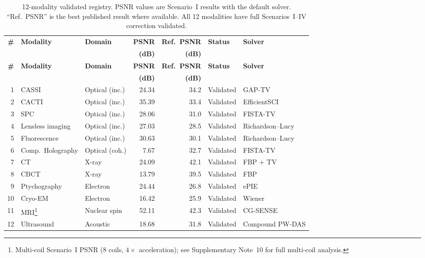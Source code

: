 \documentclass[11pt]{article}
\theoremstyle{definition}
\begin{document}
\begin{longtable}{r l l r r l l}
\caption{12-modality validated registry.  PSNR values are Scenario~I results
with the default solver.  ``Ref.\ PSNR'' is the best published result where
available.  All 12 modalities have full Scenarios~I--IV correction validated.}
\label{tab:26mod} \\
\toprule
\textbf{\#} & \textbf{Modality} & \textbf{Domain} &
  \textbf{PSNR} & \textbf{Ref.\ PSNR} & \textbf{Status} & \textbf{Solver} \\
  & & & \textbf{(dB)} & \textbf{(dB)} & & \\
\midrule
\endfirsthead
\toprule
\textbf{\#} & \textbf{Modality} & \textbf{Domain} &
  \textbf{PSNR} & \textbf{Ref.\ PSNR} & \textbf{Status} & \textbf{Solver} \\
  & & & \textbf{(dB)} & \textbf{(dB)} & & \\
\midrule
\endhead
\bottomrule
\endlastfoot
1  & CASSI                & Optical (inc.) & 24.34 & 34.2  & Validated & GAP-TV \\
2  & CACTI                & Optical (inc.) & 35.39 & 33.4  & Validated & EfficientSCI \\
3  & SPC                  & Optical (inc.) & 28.06 & 31.0  & Validated & FISTA-TV \\
4  & Lensless imaging     & Optical (inc.) & 27.03 & 28.5  & Validated & Richardson--Lucy \\
5  & Fluorescence         & Optical (inc.) & 30.63 & 30.1  & Validated & Richardson--Lucy \\
6  & Comp.\ Holography    & Optical (coh.) &  7.67 & 32.7  & Validated & FISTA-TV \\
7  & CT                   & X-ray          & 24.09 & 42.1  & Validated & FBP + TV \\
8  & CBCT                 & X-ray          & 13.79 & 39.5  & Validated & FBP \\
9  & Ptychography         & Electron       & 24.44 & 26.8  & Validated & ePIE \\
10 & Cryo-EM              & Electron       & 16.42 & 25.9  & Validated & Wiener \\
11 & MRI\footnote{Multi-coil Scenario~I PSNR (8 coils, $4\times$ acceleration); see Supplementary Note~10 for full multi-coil analysis.} & Nuclear spin & 52.11 & 42.3 & Validated & CG-SENSE \\
12 & Ultrasound           & Acoustic       & 18.68 & 31.8  & Validated & Compound PW-DAS \\
\end{longtable}
\end{document}

